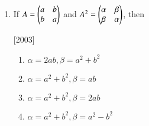 \documentclass[journal]{IEEEtran}
\numberwithin{equation}{enumi}
\numberwithin{figure}{enumi}
\begin{document}
\begin{enumerate}
        \hfill[2003]
        
        \begin{enumerate}
		\item $\omega^{2}$ 
                \item 0                      
                \item 1
                \item $\omega$
        \end{enumerate}


\item
        If $A=\begin{pmatrix}a & b \\ b & a\end{pmatrix}$ and $A^{2}=\begin{pmatrix}\alpha & \beta \\ \beta & \alpha\end{pmatrix}$, then 
        
        \hfill[2003]
                                             
        \begin{enumerate}
		\item $\alpha=2ab, \beta=a^{2}+b^{2}$
                \item $\alpha=a^{2}+b^{2}, \beta=ab$
                \item $\alpha=a^{2}+b^{2}, \beta=2ab$
                \item $\alpha=a^{2}+b^{2}, \beta=a^{2}-b^{2}$
        \end{enumerate}

		
\end{enumerate}
\end{document}
